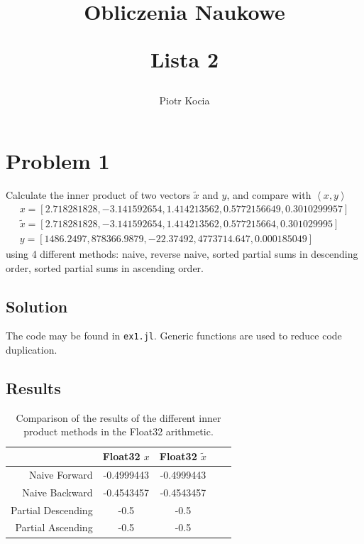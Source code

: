 \documentclass[a4paper, 12pt]{article}
\title{
  Obliczenia Naukowe\\
  \begin{center}\Large Lista 2\end{center}
}
\author{Piotr Kocia}
\newcommand{\code}[1]{\texttt{#1}}
\begin{document}
\maketitle

\tableofcontents

\section{Problem 1}
Calculate the inner product of two vectors $\tilde{x}$ and $y$, and compare with $\left< x, y \right>$
\begin{gather*}
  x = [2.718281828, -3.141592654, 1.414213562, 0.5772156649, 0.3010299957] \\
  \tilde{x} = [2.718281828, -3.141592654, 1.414213562, 0.577215664, 0.301029995] \\
  y = [1486.2497, 878366.9879, -22.37492, 4773714.647, 0.000185049]
\end{gather*}
using 4 different methods: naive, reverse naive, sorted partial sums in
descending order, sorted partial sums in ascending order.

\subsection{Solution}
The code may be found in \code{ex1.jl}. Generic functions are used to reduce
code duplication.

\subsection{Results}
\begin{table}[H]
\centering
\begin{tabular}{@{}rcccc@{}}
\toprule
                   & Float32 $x$             & Float32 $\tilde{x}$   \\ \midrule
Naive Forward      & -0.4999443              & -0.4999443            \\ \midrule
Naive Backward     & -0.4543457              & -0.4543457            \\ \midrule
Partial Descending & -0.5                    & -0.5                  \\ \midrule
Partial Ascending  & -0.5                    & -0.5                  \\ \bottomrule
\end{tabular}
\caption{Comparison of the results of the different inner product methods in the
Float32 arithmetic.}
\label{tab:inner_products_f32}
\end{table}
\end{document}
